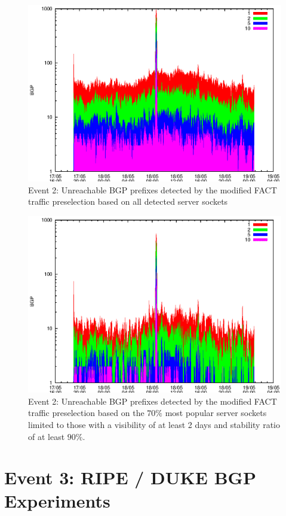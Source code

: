 \begin{figure}
	[p] \centering 
	\includegraphics[width=0.75\linewidth]{images/events/2010_05_18/bgp_log_all_external.eps}
	\caption{Event 2: Unreachable BGP prefixes detected by the modified FACT traffic preselection based on all detected server sockets} 
	\label{fig:TIER1_FACT_allSES} 
\end{figure}


\begin{figure}
	[p] \centering 
	\includegraphics[width=0.75\linewidth]{images/events/2010_05_18/bgp_log_Set_var_0_1_stab_9_vts_2.eps}
	\caption{Event 2: Unreachable BGP prefixes detected by the modified FACT traffic preselection based on the $70\%$ most popular server sockets limited to those with a visibility of at least 2 days and stability ratio of at least $90\%$.} 
	\label{fig:TIER1_FACT_popularVTS2STAB9} 
\end{figure}

\newpage
\section{Event 3: RIPE / DUKE BGP Experiments}

